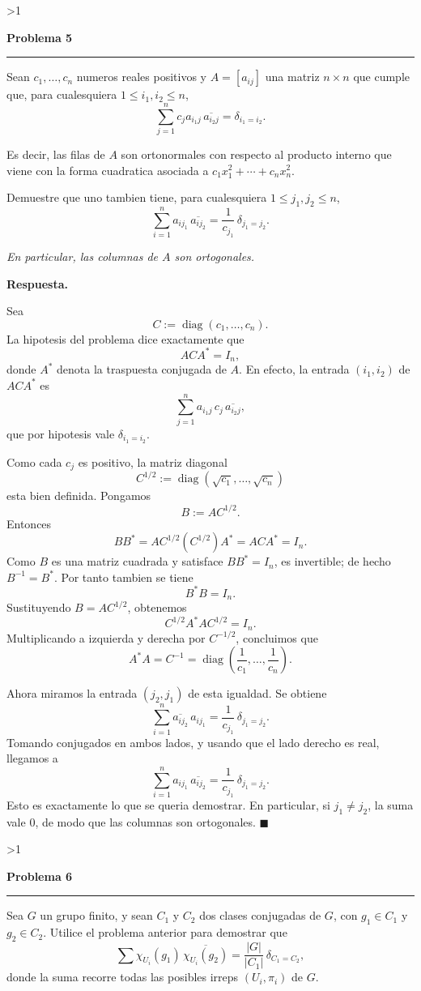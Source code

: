 \documentclass[10pt,a4paper]{article}
\newcommand{\inlinehead}[2][repblue]{%
  \par\smallskip
  {\color{#1}\bfseries #2.}\hspace{0.45em}%
}
\newcommand{\answer}{\inlinehead{Respuesta}}
\newcounter{probcnt}
\newcommand{\problem}[2]{%
  \stepcounter{probcnt}%
  \ifnum\value{probcnt}>1\newpage\fi
  \par\vspace{0.25em}
  {\large\bfseries\color{repblue} Problema #1}\par
  {\color{repline}\rule{\linewidth}{0.55pt}}\par
  \begin{tcolorbox}[
    breakable,
    colback=white,
    colframe=repline,
    borderline west={1.6pt}{0pt}{repteal},
    left=0.7em,
    right=0.7em,
    top=0.35em,
    bottom=0.3em,
    before skip=0.35em,
    after skip=0.45em
  ]
    #2
  \end{tcolorbox}
}
\begin{document}
\problem{5}{%
Sean $c_1,\dots,c_n$ numeros reales positivos y $A=[a_{ij}]$ una matriz
$n\times n$ que cumple que, para cualesquiera $1\le i_1,i_2\le n$,
\[
  \sum_{j=1}^n c_j a_{i_1 j}\,\overline{a_{i_2 j}}=\delta_{i_1=i_2}.
\]

Es decir, las filas de $A$ son ortonormales con respecto al producto interno que
viene con la forma cuadratica asociada a
$c_1x_1^2+\cdots+c_nx_n^2$.

Demuestre que uno tambien tiene, para cualesquiera $1\le j_1,j_2\le n$,
\[
  \sum_{i=1}^n a_{i j_1}\,\overline{a_{i j_2}}
  =\frac{1}{c_{j_1}}\,\delta_{j_1=j_2}.
\]

\smallskip
\textit{En particular, las columnas de $A$ son ortogonales.}
}

\answer
Sea
\[
  C:=\operatorname{diag}(c_1,\dots,c_n).
\]
La hipotesis del problema dice exactamente que
\[
  A C A^*=I_n,
\]
donde $A^*$ denota la traspuesta conjugada de $A$. En efecto, la entrada
$(i_1,i_2)$ de $A C A^*$ es
\[
  \sum_{j=1}^n a_{i_1j}\,c_j\,\overline{a_{i_2j}},
\]
que por hipotesis vale $\delta_{i_1=i_2}$.

Como cada $c_j$ es positivo, la matriz diagonal
\[
  C^{1/2}:=\operatorname{diag}(\sqrt{c_1},\dots,\sqrt{c_n})
\]
esta bien definida. Pongamos
\[
  B:=A C^{1/2}.
\]
Entonces
\[
  BB^*=A C^{1/2}(C^{1/2})A^*=A C A^*=I_n.
\]
Como $B$ es una matriz cuadrada y satisface $BB^*=I_n$, es invertible; de
hecho $B^{-1}=B^*$. Por tanto tambien se tiene
\[
  B^*B=I_n.
\]
Sustituyendo $B=A C^{1/2}$, obtenemos
\[
  C^{1/2}A^*A C^{1/2}=I_n.
\]
Multiplicando a izquierda y derecha por $C^{-1/2}$, concluimos que
\[
  A^*A=C^{-1}=
  \operatorname{diag}\!\left(\frac1{c_1},\dots,\frac1{c_n}\right).
\]

Ahora miramos la entrada $(j_2,j_1)$ de esta igualdad. Se obtiene
\[
  \sum_{i=1}^n \overline{a_{i j_2}}\,a_{i j_1}
  =\frac{1}{c_{j_1}}\,\delta_{j_1=j_2}.
\]
Tomando conjugados en ambos lados, y usando que el lado derecho es real,
llegamos a
\[
  \sum_{i=1}^n a_{i j_1}\,\overline{a_{i j_2}}
  =\frac{1}{c_{j_1}}\,\delta_{j_1=j_2}.
\]
Esto es exactamente lo que se queria demostrar. En particular, si
$j_1\ne j_2$, la suma vale $0$, de modo que las columnas son ortogonales.
\hfill$\blacksquare$

\problem{6}{%
Sea $G$ un grupo finito, y sean $C_1$ y $C_2$ dos clases conjugadas de $G$, con
$g_1\in C_1$ y $g_2\in C_2$. Utilice el problema anterior para demostrar que
\[
  \sum \chi_{U_i}(g_1)\,\overline{\chi_{U_i}(g_2)}
  =\frac{|G|}{|C_1|}\,\delta_{C_1=C_2},
\]
donde la suma recorre todas las posibles irreps $(U_i,\pi_i)$ de $G$.
}
\end{document}
